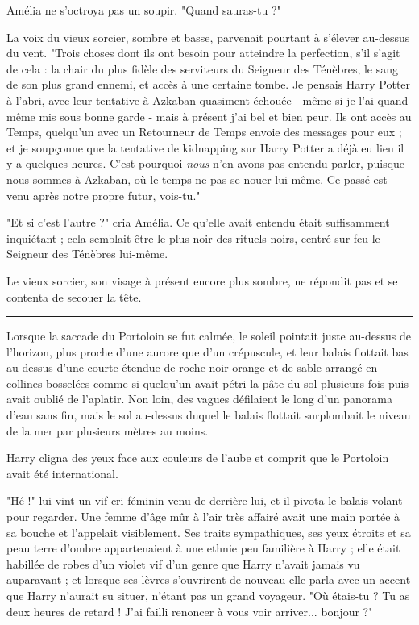 Amélia ne s'octroya pas un soupir. "Quand sauras-tu ?"

La voix du vieux sorcier, sombre et basse, parvenait pourtant à s'élever au-dessus du vent. "Trois choses dont ils ont besoin pour atteindre la perfection, s'il s'agit de cela : la chair du plus fidèle des serviteurs du Seigneur des Ténèbres, le sang de son plus grand ennemi, et accès à une certaine tombe. Je pensais Harry Potter à l'abri, avec leur tentative à Azkaban quasiment échouée - même si je l'ai quand même mis sous bonne garde - mais à présent j'ai bel et bien peur. Ils ont accès au Temps, quelqu'un avec un Retourneur de Temps envoie des messages pour eux ; et je soupçonne que la tentative de kidnapping sur Harry Potter a déjà eu lieu il y a quelques heures. C'est pourquoi \emph{nous}  n'en avons pas entendu parler, puisque nous sommes à Azkaban, où le temps ne pas se nouer lui-même. Ce passé est venu après notre propre futur, vois-tu."

"Et si c'est l'autre ?" cria Amélia. Ce qu'elle avait entendu était suffisamment inquiétant ; cela semblait être le plus noir des rituels noirs, centré sur feu le Seigneur des Ténèbres lui-même.

Le vieux sorcier, son visage à présent encore plus sombre, ne répondit pas et se contenta de secouer la tête.
\par\noindent\rule{\textwidth}{0.4pt}
Lorsque la saccade du Portoloin se fut calmée, le soleil pointait juste au-dessus de l'horizon, plus proche d'une aurore que d'un crépuscule, et leur balais flottait bas au-dessus d'une courte étendue de roche noir-orange et de sable arrangé en collines bosselées comme si quelqu'un avait pétri la pâte du sol plusieurs fois puis avait oublié de l'aplatir. Non loin, des vagues défilaient le long d'un panorama d'eau sans fin, mais le sol au-dessus duquel le balais flottait surplombait le niveau de la mer par plusieurs mètres au moins.

Harry cligna des yeux face aux couleurs de l'aube et comprit que le Portoloin avait été international.

"Hé !" lui vint un vif cri féminin venu de derrière lui, et il pivota le balais volant pour regarder. Une femme d'âge mûr à l'air très affairé avait une main portée à sa bouche et l'appelait visiblement. Ses traits sympathiques, ses yeux étroits et sa peau terre d'ombre appartenaient à une ethnie peu familière à Harry ; elle était habillée de robes d'un violet vif d'un genre que Harry n'avait jamais vu auparavant ; et lorsque ses lèvres s'ouvrirent de nouveau elle parla avec un accent que Harry n'aurait su situer, n'étant pas un grand voyageur. "Où étais-tu ? Tu as deux heures de retard ! J'ai failli renoncer à vous voir arriver... bonjour ?"

